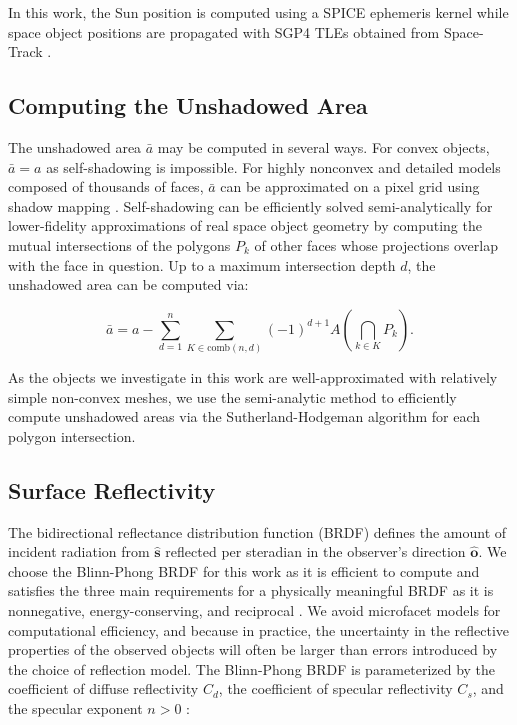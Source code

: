 \documentclass[a4paper,twocolumn]{spaceDebrisC} %
\newcommand{\vctr}[1]{\bm{#1}}
\newcommand{\unitv}[1]{\hat{\vctr{#1}}}
\begin{document}
In this work, the Sun position is computed using a SPICE ephemeris kernel \cite{spice} while space object positions are propagated with SGP4 TLEs obtained from Space-Track \cite{spacetrack}.

\subsection{Computing the Unshadowed Area}

The unshadowed area $\bar{a}$ may be computed in several ways. For convex objects, $\bar{a}=a$ as self-shadowing is impossible. For highly nonconvex and detailed models composed of thousands of faces, $\bar{a}$ can be approximated on a pixel grid using shadow mapping \cite{robinson2022}. Self-shadowing can be efficiently solved semi-analytically for lower-fidelity approximations of real space object geometry by computing the mutual intersections of the polygons $P_k$ of other faces whose projections overlap with the face in question. Up to a maximum intersection depth $d$, the unshadowed area can be computed via:

\begin{equation} \label{eq:us_area}
 \bar{a} = a - \sum_{d=1}^{n} \sum_{K \in \text{comb}(n,d)} (-1)^{d+1} A\left(\bigcap\limits_{k \in K} P_k\right).
\end{equation}

As the objects we investigate in this work are well-approximated with relatively simple non-convex meshes, we use the semi-analytic method to efficiently compute unshadowed areas via the Sutherland-Hodgeman algorithm \cite{sutherland1974} for each polygon intersection.

\subsection{Surface Reflectivity}

The bidirectional reflectance distribution function (BRDF) defines the amount of incident radiation from $\unitv{s}$ reflected per steradian in the observer's direction $\unitv{o}$. We choose the Blinn-Phong \cite{blinn1977} BRDF for this work as it is efficient to compute and satisfies the three main requirements for a physically meaningful BRDF as it is nonnegative, energy-conserving, and reciprocal \cite{duvenhage2013}. We avoid microfacet models for computational efficiency, and because in practice, the uncertainty in the reflective properties of the observed objects will often be larger than errors introduced by the choice of reflection model. The Blinn-Phong BRDF is parameterized by the coefficient of diffuse reflectivity $C_d$, the coefficient of specular reflectivity $C_s$, and the specular exponent $n>0$ \cite{duvenhage2013}:
\end{document}
